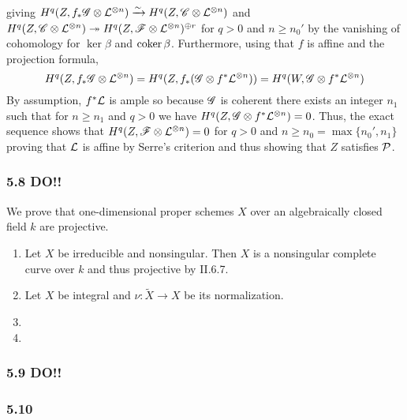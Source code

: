 \documentclass[12pt]{article}
\begin{document}
\begin{enumerate}
\begin{center}
\begin{tikzcd}[column sep = small]
\end{tikzcd}
\end{center}
giving $H^q(Z, f_* \G \otimes \L^{\otimes n}) \iso H^q(Z, \sC \otimes \L^{\otimes n})$ and $H^q(Z, \sC \otimes \L^{\otimes n}) \onto H^q(Z, \F \otimes \L^{\otimes n})^{\oplus r}$ for $q > 0$ and $n \ge n_0'$  by the vanishing of cohomology for $\ker{\beta}$ and $\coker{\beta}$. Furthermore, using that $f$ is affine and the projection formula,
\[ H^q(Z, f_* \G \otimes \L^{\otimes n}) = H^q(Z, f_* (\G \otimes f^* \L^{\otimes n})) = H^q(W, \G \otimes f^* \L^{\otimes n}) \]
By assumption, $f^* \L$ is ample so because $\G$ is coherent there exists an integer $n_1$ such that for $n \ge n_1$ and $q > 0$ we have $H^q(Z, \G \otimes f^* \L^{\otimes n}) = 0$. Thus, the exact sequence shows that $H^q(Z, \F \otimes \L^{\otimes n}) = 0$ for $q > 0$ and $n \ge n_0 = \max\{n_0', n_1\}$ proving that $\L$ is affine by Serre's criterion and thus showing that $Z$ satisfies $\cP$.
\end{enumerate}

\subsubsection{5.8 DO!!}

We prove that one-dimensional proper schemes $X$ over an algebraically closed field $k$ are projective.

\begin{enumerate}
\item Let $X$ be irreducible and nonsingular. Then $X$ is a nonsingular complete curve over $k$ and thus projective by II.6.7. 

\item Let $X$ be integral and $\nu : \tilde{X} \to X$ be its normalization. 

\item

\item
\end{enumerate}

\subsubsection{5.9 DO!!}

\subsubsection{5.10}
\end{document}

